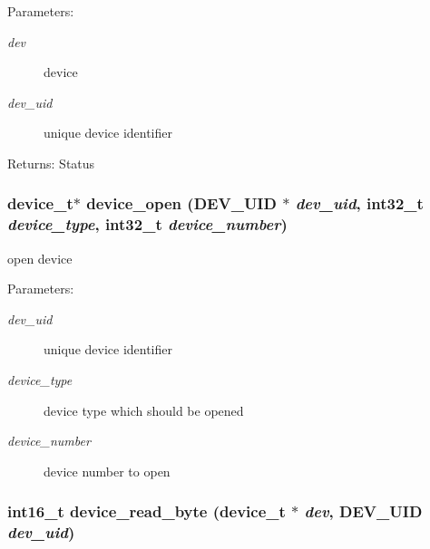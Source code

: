\begin{Desc}
\item[Parameters:]
\begin{description}
\item[{\em dev}]device \item[{\em dev\_\-uid}]unique device identifier \end{description}
\end{Desc}
\begin{Desc}
\item[Returns:]Status \end{Desc}
\hypertarget{group___d_e_v_i_c_e___a_p_i_gb4bf1da93b05a0e9b89351a6f14b8d86}{
\subsubsection[{device\_\-open}]{\setlength{\rightskip}{0pt plus 5cm}device\_\-t$\ast$ device\_\-open ({\bf DEV\_\-UID} $\ast$ {\em dev\_\-uid}, \/  int32\_\-t {\em device\_\-type}, \/  int32\_\-t {\em device\_\-number})}}
\label{group___d_e_v_i_c_e___a_p_i_gb4bf1da93b05a0e9b89351a6f14b8d86}


open device 

\begin{Desc}
\item[Parameters:]
\begin{description}
\item[{\em dev\_\-uid}]unique device identifier \item[{\em device\_\-type}]device type which should be opened \item[{\em device\_\-number}]device number to open \end{description}
\end{Desc}
\hypertarget{group___d_e_v_i_c_e___a_p_i_g61a1f3d441ef22c1fe3d42420134c51d}{
\subsubsection[{device\_\-read\_\-byte}]{\setlength{\rightskip}{0pt plus 5cm}int16\_\-t device\_\-read\_\-byte (device\_\-t $\ast$ {\em dev}, \/  {\bf DEV\_\-UID} {\em dev\_\-uid})}}
\label{group___d_e_v_i_c_e___a_p_i_g61a1f3d441ef22c1fe3d42420134c51d}


